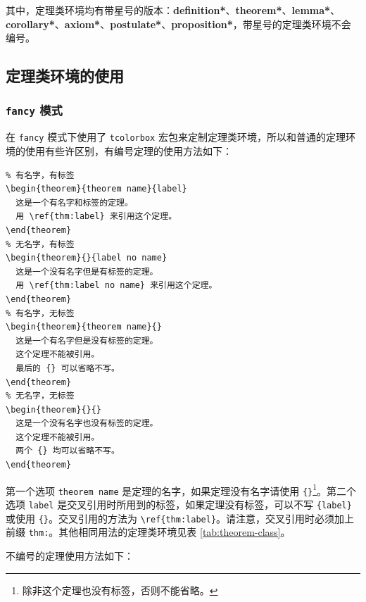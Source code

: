\documentclass[lang=cn,newtx,10pt,scheme=chinese]{elegantbook}
\begin{document}
其中，定理类环境均有带星号的版本：\textcolor{main}{\textbf{definition*}}、\textcolor{second}{\textbf{theorem*}}、\textcolor{second}{\textbf{lemma*}}、\textcolor{second}{\textbf{corollary*}}、\textcolor{second}{\textbf{axiom*}}、\textcolor{second}{\textbf{postulate*}}、\textcolor{third}{\textbf{proposition*}}，带星号的定理类环境不会编号。

\subsection{定理类环境的使用}

\subsubsection{\texttt{fancy} 模式}

在 \lstinline{fancy} 模式下使用了 \lstinline{tcolorbox} 宏包来定制定理类环境，所以和普通的定理环境的使用有些许区别，有编号定理的使用方法如下：

\begin{lstlisting}
% 有名字，有标签
\begin{theorem}{theorem name}{label}
  这是一个有名字和标签的定理。
  用 \ref{thm:label} 来引用这个定理。
\end{theorem}
% 无名字，有标签
\begin{theorem}{}{label no name}
  这是一个没有名字但是有标签的定理。
  用 \ref{thm:label no name} 来引用这个定理。
\end{theorem}
% 有名字，无标签
\begin{theorem}{theorem name}{}
  这是一个有名字但是没有标签的定理。
  这个定理不能被引用。
  最后的 {} 可以省略不写。
\end{theorem}
% 无名字，无标签
\begin{theorem}{}{}
  这是一个没有名字也没有标签的定理。
  这个定理不能被引用。
  两个 {} 均可以省略不写。
\end{theorem}
\end{lstlisting}

第一个选项 \lstinline{theorem name} 是定理的名字，如果定理没有名字请使用 \lstinline|{}|\cprotect\footnote{除非这个定理也没有标签，否则不能省略。}。第二个选项 \lstinline{label} 是交叉引用时所用到的标签，如果定理没有标签，可以不写 \lstinline|{label}| 或使用 \lstinline|{}|。交叉引用的方法为 \lstinline|\ref{thm:label}|。请注意，交叉引用时必须加上前缀 \lstinline{thm:}。其他相同用法的定理类环境见表 \ref{tab:theorem-class}。

不编号的定理使用方法如下：
\end{document}
